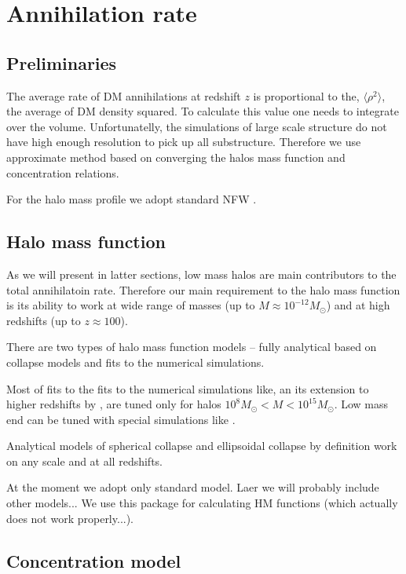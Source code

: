 \section{Annihilation rate}

\subsection{Preliminaries}

The average rate of DM annihilations at redshift $z$ is proportional to the, $\langle \rho^2 \rangle$, the average of DM density squared. To calculate this value one needs to integrate over the volume. Unfortunatelly, the simulations of large scale structure do not have high enough resolution to pick up all substructure. Therefore we use approximate method based on converging the halos mass function and concentration relations.


For the halo mass profile we adopt standard NFW \cite{1997ApJ...490..493N}. 

\subsection{Halo mass function}

As we will present in latter sections, low mass halos are main contributors to the total annihilatoin rate. Therefore our main requirement to the halo mass function is its ability to work at wide range of masses (up to $M \approx 10^{-12}M_\odot$) and at high redshifts (up to $z \approx 100$). 

There are two types of halo mass function models -- fully analytical based on collapse models and fits to the numerical simulations.

Most of fits to the fits to the numerical simulations like, \citet{Tinker_2008} an its extension to higher redshifts by \citet{Behroozi_2013}, are tuned only for halos $10^{8}M_\odot < M < 10^{15}M_\odot$. Low mass end can be tuned with special simulations like \cite{Diemand_2005}.

Analytical models of spherical collapse \citep{Press_1974} and ellipsoidal collapse \citep{Sheth_2001} by definition work on any scale and at all redshifts.

At the moment we adopt only standard \citet{Press_1974} model. Laer we will probably include other models... We use this package for calculating HM functions \cite{Murray_2013} (which actually does not work properly...).

\subsection{Concentration model}

